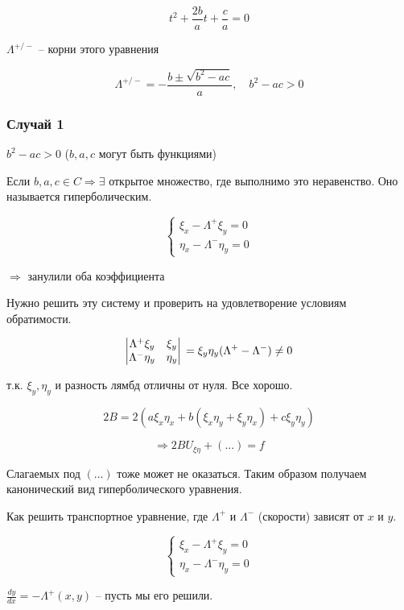 \documentclass[12pt]{report}
\begin{document}
$$t^2 + \frac{2b}{a}t + \frac{c}{a} = 0$$

$\Lambda^{+ / -}$ -- корни этого уравнения

$$\Lambda^{+ / -} = - \frac{b \pm \sqrt{b^2 - ac}}{a}, \quad b^2 - ac > 0$$

\subsubsection{Случай 1}

$b^2 - ac > 0$ ($b, a, c$ могут быть функциями)

Если $b, a, c \in C \Longrightarrow \exists$ открытое множество, где выполнимо это неравенство. Оно называется гиперболическим. 

\[
    \begin{cases}
        \xi_x - \Lambda^+ \xi_y = 0
        \\
        \eta_x - \Lambda^- \eta_y = 0
    \end{cases}
\]

$\Longrightarrow$ занулили оба коэффициента

Нужно решить эту систему и проверить на удовлетворение условиям обратимости. 

\[
    \begin{vmatrix}
        \Lambda^+ \xi_y & \xi_y
        \\
        \Lambda^- \eta_y & \eta_y
    \end{vmatrix}
    \\
    =
    \\
    \xi_y \eta_y (\Lambda^+ - \Lambda^-) \neq 0
\]

т.к. $\xi_y, \eta_y$ и разность лямбд отличны от нуля. Все хорошо. 

$$2B = 2(a \xi_x \eta_x + b(\xi_x \eta_y + \xi_y \eta_x) + c \xi_y \eta_y)$$

$$\Longrightarrow 2B U_{\xi \eta} + (...) = f$$

Слагаемых под $(...)$ тоже может не оказаться. Таким образом получаем канонический вид гиперболического уравнения. 

Как решить транспортное уравнение, где $\Lambda^+$ и $\Lambda^-$ (скорости) зависят от $x$ и $y$. 

\[
    \begin{cases}
        \xi_x - \Lambda^+ \xi_y = 0
        \\
        \eta_x - \Lambda^- \eta_y = 0
    \end{cases}
\]

$\frac{dy}{dx} = - \Lambda^+(x, y)$ -- пусть мы его решили. 
\end{document}
